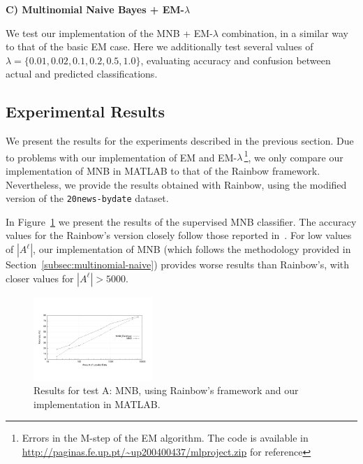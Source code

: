 \textbf{C) Multinomial Naive Bayes + EM-$\lambda$}\vertbreak

We test our implementation of the MNB + EM-$\lambda$ combination, in a similar 
way to that of the basic EM case. Here we additionally test several values of 
$\lambda = \{0.01, 0.02, 0.1, 0.2, 0.5, 1.0\}$, evaluating accuracy and confusion 
between actual and predicted classifications.

\subsection{Experimental Results}
\label{subsec:exp-res}

We present the results for the experiments described in the previous section. 
Due to problems with our implementation of EM and 
EM-$\lambda$\,\footnote{Errors in the M-step of the EM algorithm. The code 
is available in \url{http://paginas.fe.up.pt/~up200400437/mlproject.zip} for 
reference}, we only compare 
our implementation of MNB in MATLAB to that of the Rainbow 
framework. Nevertheless, we provide the results obtained with Rainbow, using 
the modified version of the \verb+20news-bydate+ dataset.\vertbreak

In Figure~\ref{fig:mnb} we present the results of the supervised MNB 
classifier. The accuracy values for the Rainbow's version closely follow those 
reported in~\cite{Nigam2000}. For low values of $|A^\ell|$, our implementation 
of MNB (which follows the methodology provided in Section~\ref{subsec:multinomial-naive}) provides 
worse results than Rainbow's, with closer values for $|A^\ell| > 5000$.\vertbreak

\begin{figure}[h!]

    \centering
    \includegraphics[width=0.40\textwidth]{figures/mnb.pdf}
    \cprotect\caption{Results for test A: MNB, using Rainbow's framework and 
        our implementation in MATLAB.}
    \label{fig:mnb}

\end{figure}

